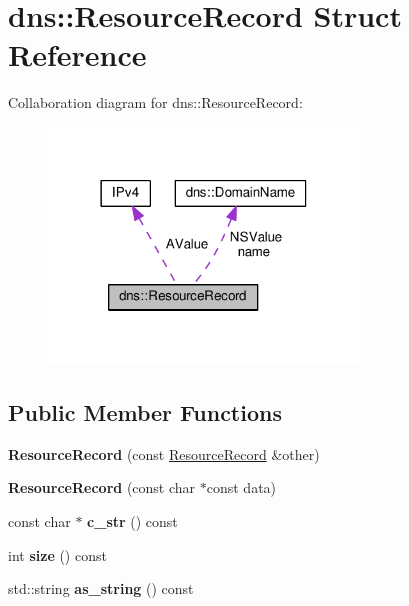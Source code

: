 \hypertarget{structdns_1_1ResourceRecord}{}\section{dns\+:\+:Resource\+Record Struct Reference}
\label{structdns_1_1ResourceRecord}


Collaboration diagram for dns\+:\+:Resource\+Record\+:
\nopagebreak
\begin{figure}[H]
\begin{center}
\leavevmode
\includegraphics[width=234pt]{structdns_1_1ResourceRecord__coll__graph}
\end{center}
\end{figure}
\subsection*{Public Member Functions}
\begin{DoxyCompactItemize}
\item 
{\bfseries Resource\+Record} (const \hyperlink{structdns_1_1ResourceRecord}{Resource\+Record} \&other)\hypertarget{structdns_1_1ResourceRecord_a1d953b0a89f6e04b6d28072d776eb3dd}{}\label{structdns_1_1ResourceRecord_a1d953b0a89f6e04b6d28072d776eb3dd}

\item 
{\bfseries Resource\+Record} (const char $\ast$const data)\hypertarget{structdns_1_1ResourceRecord_a0d9cb7a786c964487cd16191fee9c8de}{}\label{structdns_1_1ResourceRecord_a0d9cb7a786c964487cd16191fee9c8de}

\item 
const char $\ast$ {\bfseries c\+\_\+str} () const \hypertarget{structdns_1_1ResourceRecord_a44230c7a2543fcf77060eed526d76fa1}{}\label{structdns_1_1ResourceRecord_a44230c7a2543fcf77060eed526d76fa1}

\item 
int {\bfseries size} () const \hypertarget{structdns_1_1ResourceRecord_ac686d613eaa1567545ec4cb599d22e32}{}\label{structdns_1_1ResourceRecord_ac686d613eaa1567545ec4cb599d22e32}

\item 
std\+::string {\bfseries as\+\_\+string} () const \hypertarget{structdns_1_1ResourceRecord_acbc8eaef9fb71167e40565cbc8f17a0d}{}\label{structdns_1_1ResourceRecord_acbc8eaef9fb71167e40565cbc8f17a0d}

\end{DoxyCompactItemize}
